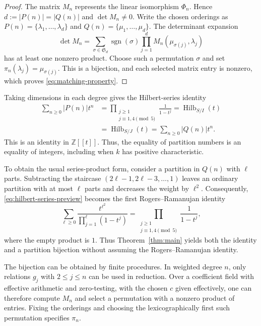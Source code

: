 \documentclass[11pt,reqno]{amsart}
\theoremstyle{definition}
\theoremstyle{remark}
\theoremstyle{plain}
\begin{document}
\begin{proof}
The matrix \(M_n\) represents the linear isomorphism \(\Phi_n\).
Hence \(d:=|P(n)|=|Q(n)|\) and \(\det M_n\neq0\).
Write the chosen orderings as
\(P(n)=\{\lambda_1,\ldots,\lambda_d\}\) and
\(Q(n)=\{\mu_1,\ldots,\mu_d\}\).
The determinant expansion
$$
 \det M_n=
 \sum_{\sigma\in\mathfrak S_d}
 \operatorname{sgn}(\sigma)
 \prod_{j=1}^d M_n(\mu_{\sigma(j)},\lambda_j)
$$
has at least one nonzero product.  Choose such a permutation
\(\sigma\) and set
\(\pi_n(\lambda_j)=\mu_{\sigma(j)}\).
This is a bijection, and each selected matrix entry is nonzero,
which proves \eqref{eq:matching-property}.
\end{proof}

Taking dimensions in each degree gives the Hilbert-series identity \cite[Corollary~1.15]{IimaYoshino2009}
\begin{equation}\label{eq:hilbert-series-preview}
\begin{aligned}
 \sum_{n\geq0}|P(n)|t^n
 &=\prod_{\substack{j\geq1\\j\equiv1,4\pmod5}}
   \frac{1}{1-t^j}
 =\operatorname{Hilb}_{S/I}(t)\\
 &=\operatorname{Hilb}_{S/J}(t)
 =\sum_{n\geq0}|Q(n)|t^n.
\end{aligned}
\end{equation}
This is an identity in \(\mathbb Z[[t]]\). Thus, the equality of
partition numbers is an equality of integers, including when \(k\)
has positive characteristic.

To obtain the usual series-product form, consider a partition in
\(Q(n)\) with \(\ell\) parts.  Subtracting the staircase
\((2\ell-1,2\ell-3,\ldots,1)\) leaves an ordinary partition with
at most \(\ell\) parts and decreases the weight by \(\ell^2\).
Consequently, \eqref{eq:hilbert-series-preview} becomes the first
Rogers–Ramanujan identity
$$
 \sum_{\ell\geq0}
 \frac{t^{\ell^2}}{\prod_{j=1}^{\ell}(1-t^j)}
 =
 \prod_{\substack{j\geq1\\j\equiv1,4\pmod5}}
 \frac{1}{1-t^j},
$$
where the empty product is \(1\).
Thus Theorem~\ref{thm:main} yields both the identity and a partition
bijection without assuming the Rogers–Ramanujan identity.

The bijection can be obtained by finite procedures.  In weighted
degree \(n\), only relations \(g_j\) with \(2\leq j\leq n\) can be
used in reduction.  Over a coefficient field with effective
arithmetic and zero-testing, with the chosen \(c\) given effectively,
one can therefore compute \(M_n\) and select a permutation with a
nonzero product of entries.  Fixing the orderings and choosing the
lexicographically first such permutation specifies \(\pi_n\).
\end{document}
